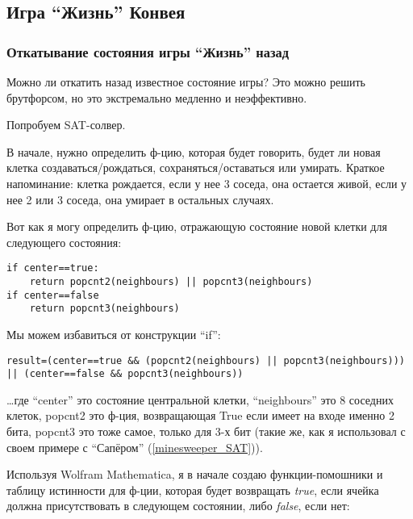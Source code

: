 \subsection{Игра ``Жизнь'' Конвея}

\renewcommand{\CURPATH}{CA/GoL}

\subsubsection{Откатывание состояния игры ``Жизнь'' назад}

Можно ли откатить назад известное состояние игры?
Это можно решить брутфорсом, но это экстремально медленно и неэффективно.

Попробуем SAT-солвер.

В начале, нужно определить ф-цию, которая будет говорить, будет ли новая клетка создаваться/рождаться, сохраняться/оставаться
или умирать.
Краткое напоминание: клетка рождается, если у нее 3 соседа, она остается живой, если у нее 2 или 3 соседа, она умирает
в остальных случаях.

Вот как я могу определить ф-цию, отражающую состояние новой клетки для следующего состояния:

\begin{lstlisting}
if center==true:
	return popcnt2(neighbours) || popcnt3(neighbours)
if center==false
	return popcnt3(neighbours)
\end{lstlisting}

Мы можем избавиться от конструкции ``if'':

\begin{lstlisting}
result=(center==true && (popcnt2(neighbours) || popcnt3(neighbours))) || (center==false && popcnt3(neighbours))
\end{lstlisting}

\dots где ``center'' это состояние центральной клетки, ``neighbours'' это 8 соседних клеток, popcnt2 это ф-ция,
возвращающая True если имеет на входе именно 2 бита, popcnt3 это тоже самое, только для 3-х бит
(такие же, как я использовал с своем примере с ``Сапёром'' (\ref{minesweeper_SAT})).

Используя Wolfram Mathematica, я в начале создаю функции-помошники и таблицу истинности для ф-ции, которая будет возвращать
\textit{true}, если ячейка должна присутствовать в следующем состоянии, либо \textit{false}, если нет:

